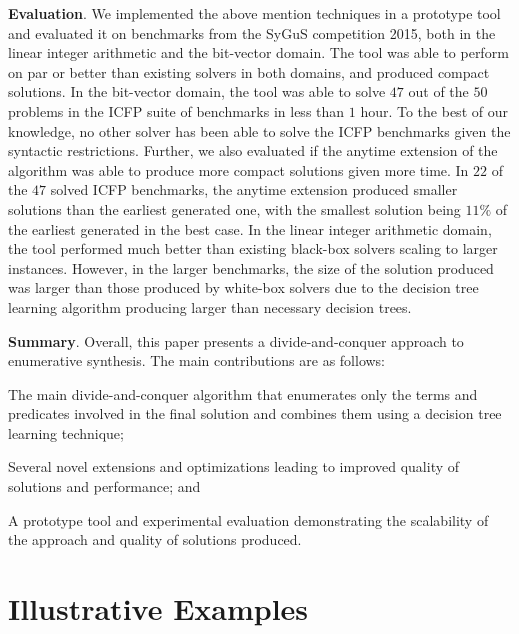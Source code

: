 \documentclass{llncs}
\newcommand{\sygus}{{\sffamily\fontsize{8.5}{10}\selectfont
    SyGuS}\xspace}
\renewcommand{\paragraph}[1]{\par\noindent\textbf{#1}.}
\begin{document}
\paragraph{Evaluation}
We implemented the above mention techniques in a prototype tool and
evaluated it on benchmarks from the \sygus competition 2015, both in the
linear integer arithmetic and the bit-vector domain.
The tool was able to perform on par or better than existing solvers in
both domains, and produced compact solutions.
In the bit-vector domain, the tool was able to solve $47$ out of the
$50$ problems in the ICFP suite of benchmarks in less than $1$ hour.
To the best of our knowledge, no other solver has been able to solve the
ICFP benchmarks given the syntactic restrictions.
Further, we also evaluated if the anytime extension of the algorithm was
able to produce more compact solutions given more time.
In $22$ of the $47$ solved ICFP benchmarks, the anytime extension
produced smaller solutions than the earliest generated one, with the
smallest solution being $11\%$ of the earliest generated in the best
case.
In the linear integer arithmetic domain, the tool performed much better
than existing black-box solvers scaling to larger instances.
However, in the larger benchmarks, the size of the solution produced was
larger than those produced by white-box solvers due to the decision tree
learning algorithm producing larger than necessary decision trees.

\paragraph{Summary}
Overall, this paper presents a divide-and-conquer approach to
enumerative synthesis.
The main contributions are as follows:
\begin{compactitem}
\item The main divide-and-conquer algorithm that enumerates only the
  terms and predicates involved in the final solution and combines them
  using a decision tree learning technique;
\item Several novel extensions and optimizations leading to improved
  quality of solutions and performance; and
\item A prototype tool and experimental evaluation demonstrating the
  scalability of the approach and quality of solutions produced.
\end{compactitem}

\section{Illustrative Examples}
\label{sec:example}
\end{document}
